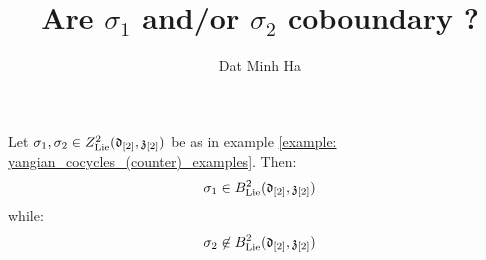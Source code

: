 

\setcounter{section}{0}


\newcommand{\toroidal}{\t}
\newcommand{\extendedtoroidal}{\hat{\t}}
\newcommand{\simpleroots}{\mathbb{I}}



    \title{Are $\sigma_1$ and/or $\sigma_2$ coboundary ?}
    
    \author{Dat Minh Ha}
    \maketitle
    
    {
    \hypersetup{} 
    }

    \begin{theorem} \label{theorem: non_trivial_yangian_cocycles_examples}
            Let $\sigma_1, \sigma_2 \in Z^2_{\mathrm{Lie}}(\mathfrak{d}_{[2]}, \mathfrak{z}_{[2]})$ be as in example \ref{example: yangian_cocycles_(counter)_examples}. Then:
                $$\sigma_1 \in B^2_{\mathrm{Lie}}(\mathfrak{d}_{[2]}, \mathfrak{z}_{[2]})$$
            while:
                $$\sigma_2 \not \in B^2_{\mathrm{Lie}}(\mathfrak{d}_{[2]}, \mathfrak{z}_{[2]})$$
        \end{theorem}
